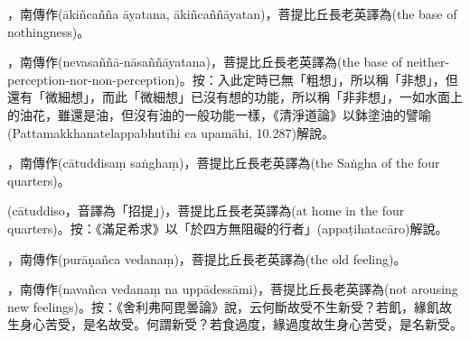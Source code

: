 \startitemgroup[noteitems]
\item{}，南傳作(ākiñcañña āyatana, ākiñcaññāyatan)，菩提比丘長老英譯為(the base of nothingness)。
\stopitemgroup

\startitemgroup[noteitems]
\item{}，南傳作(nevasaññā-nāsaññāyatana)，菩提比丘長老英譯為(the base of neither-perception-nor-non-perception)。按：入此定時已無「粗想」，所以稱「非想」，但還有「微細想」，而此「微細想」已沒有想的功能，所以稱「非非想」，一如水面上的油花，雖還是油，但沒有油的一般功能一樣，《清淨道論》以鉢塗油的譬喻(Pattamakkhanatelappabhutīhi ca upamāhi, 10.287)解說。
\stopitemgroup

\startitemgroup[noteitems]
\item{}，南傳作(cātuddisaṃ saṅghaṃ)，菩提比丘長老英譯為(the Saṅgha of the four quarters)。
\item{}(cātuddiso，音譯為「招提」)，菩提比丘長老英譯為(at home in the four quarters)。按：《滿足希求》以「於四方無阻礙的行者」(appaṭihatacāro)解說。
\stopitemgroup

\startitemgroup[noteitems]
\item{}，南傳作(purāṇañca vedanaṃ)，菩提比丘長老英譯為(the old feeling)。
\item{}，南傳作(navañca vedanaṃ na uppādessāmi)，菩提比丘長老英譯為(not arousing new feelings)。按：《舍利弗阿毘曇論》說，云何斷故受不生新受？若飢，緣飢故生身心苦受，是名故受。何謂新受？若食過度，緣過度故生身心苦受，是名新受。
\stopitemgroup

